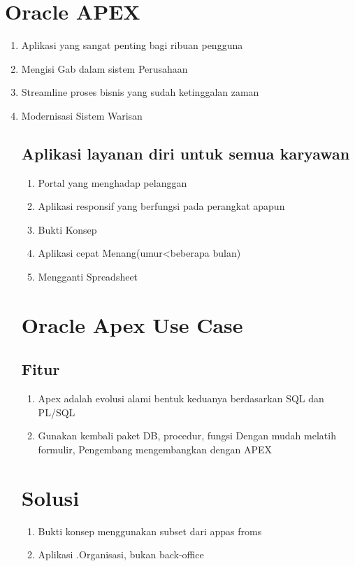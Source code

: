 \documentclass{article}
\begin{document}
\section{Oracle APEX}
      \begin{enumerate}
          \item Aplikasi yang sangat penting bagi ribuan pengguna
          \item Mengisi Gab dalam sistem Perusahaan
          \item Streamline proses bisnis yang sudah ketinggalan zaman
          \item Modernisasi Sistem Warisan
\subsection{Aplikasi layanan diri untuk semua karyawan}
      \begin{enumerate}
          \item Portal yang menghadap pelanggan
          \item Aplikasi responsif yang berfungsi pada perangkat apapun
          \item Bukti Konsep
          \item Aplikasi cepat Menang(umur<beberapa bulan)
          \item Mengganti Spreadsheet
      \end{enumerate}
\section{Oracle Apex Use Case}
  \subsection{Fitur}
  \begin{enumerate}
      \item Apex adalah evolusi alami bentuk keduanya berdasarkan SQL dan PL/SQL
      \item Gunakan kembali paket DB, procedur, fungsi
            Dengan mudah melatih formulir, Pengembang mengembangkan dengan APEX

  \end{enumerate}
 \section{Solusi}
       \begin{enumerate}
           \item Bukti konsep menggunakan subset dari appas froms
           \item Aplikasi .Organisasi, bukan back-office


\end{enumerate}
\end{enumerate}
\end{document}
